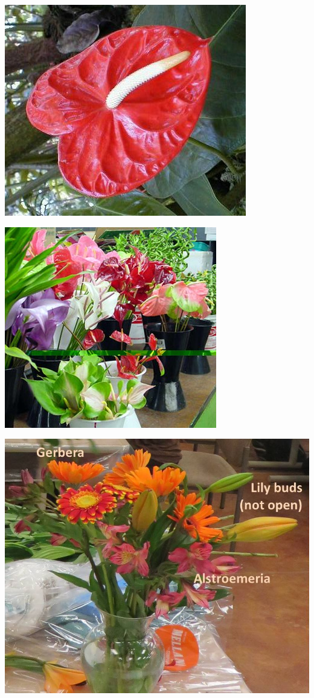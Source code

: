\documentclass{article}
\begin{document}
\begin{center}
\includegraphics[height=0.925\paperheight]{../Anthurium2.jpg}
\end{center}
\newpage

\begin{center}
\includegraphics[height=0.925\paperheight]{../AnthuriumCF.jpg}
\end{center}
\newpage

\begin{center}
\includegraphics[height=0.925\paperheight]{../Arrangement1.jpg}
\end{center}
\newpage
\end{document}
